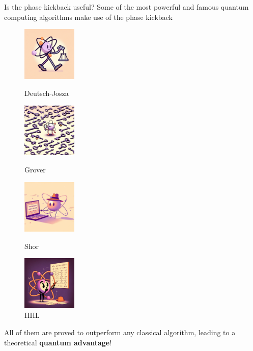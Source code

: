 \documentclass[aspectratio=169, 8pt, xcolor={svgnames}, hyperref={linkcolor=black}]{beamer}
\begin{document}
\begin{frame}{Is the phase kickback useful?}
Some of the most powerful and famous quantum computing algorithms make use of the phase kickback
\begin{multicols}{4}
\begin{figure}
   {\includegraphics[width=0.23\textwidth, height=0.4\textheight]{figures/dj.png}\caption{Deutsch-Josza}}
   {\includegraphics[width=0.23\textwidth, height=0.4\textheight]{figures/grover.png}\caption{Grover}}
   {\includegraphics[width=0.23\textwidth, height=0.4\textheight]{figures/shor.png}\caption{Shor}}
   {\includegraphics[width=0.23\textwidth, height=0.4\textheight]{figures/hhl.png}\caption{HHL}}
\end{figure}
\end{multicols}
All of them are proved to outperform any classical algorithm, leading to a theoretical \textbf{quantum 
advantage}!
\end{frame}
\end{document}
